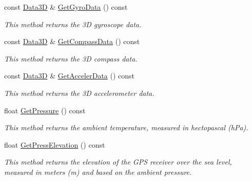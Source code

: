 \begin{DoxyCompactItemize}
\mbox{\label{classGPSInterface_ac3672cc76506fe6ed1ee4824a57c0857}} 
const \hyperlink{structData3D}{Data3D} \& \hyperlink{classGPSInterface_ac3672cc76506fe6ed1ee4824a57c0857}{Get\+Gyro\+Data} () const
\begin{DoxyCompactList}\small\item\em This method returns the 3D gyroscope data. \end{DoxyCompactList}\item 
\mbox{\label{classGPSInterface_aa0032f67cd64db9ddeee1b275025b417}} 
const \hyperlink{structData3D}{Data3D} \& \hyperlink{classGPSInterface_aa0032f67cd64db9ddeee1b275025b417}{Get\+Compass\+Data} () const
\begin{DoxyCompactList}\small\item\em This method returns the 3D compass data. \end{DoxyCompactList}\item 
\mbox{\label{classGPSInterface_a675644b668df300d19afaefff9849886}} 
const \hyperlink{structData3D}{Data3D} \& \hyperlink{classGPSInterface_a675644b668df300d19afaefff9849886}{Get\+Acceler\+Data} () const
\begin{DoxyCompactList}\small\item\em This method returns the 3D accelerometer data. \end{DoxyCompactList}\item 
\mbox{\label{classGPSInterface_a63ed7a32797c2fc7557bfdfdb74c43ed}} 
float \hyperlink{classGPSInterface_a63ed7a32797c2fc7557bfdfdb74c43ed}{Get\+Pressure} () const
\begin{DoxyCompactList}\small\item\em This method returns the ambient temperature, measured in hectopascal (h\+Pa). \end{DoxyCompactList}\item 
\mbox{\label{classGPSInterface_aa6c34c4c04bea958c4ad15a2cd728e5e}} 
float \hyperlink{classGPSInterface_aa6c34c4c04bea958c4ad15a2cd728e5e}{Get\+Press\+Elevation} () const
\begin{DoxyCompactList}\small\item\em This method returns the elevation of the G\+PS receiver over the sea level, measured in meters (m) and based on the ambient pressure. \end{DoxyCompactList}\item 

\end{DoxyCompactItemize}
